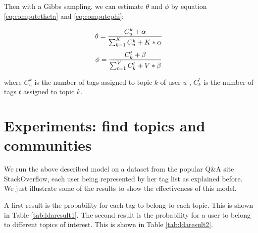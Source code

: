 Then with a Gibbs sampling, we can estimate $\theta$ and $\phi$ by equation \ref{eq:computetheta} and \ref{eq:computephi}:

\begin{equation}\scriptsize
\theta=\frac{ C_u^k + \alpha}{ \sum_{k=1}^K C_u^k+ K* \alpha}
\label{eq:computetheta} 
\end{equation}
\begin{equation}\scriptsize
\phi =\frac{ C_k^t + \beta}{ \sum_{t=1}^V C_k^t+ V* \beta}
\label{eq:computephi} 
\end{equation}

\noindent
where $C_u^k$ is the number of tags assigned to topic $k$ of user $u$ , $C_k^t$ is the number of tags $t$ assigned to topic $k$.


\section{Experiments: find topics and communities}
We run the above described model on a dataset from the popular Q\&A site StackOverflow, each user being represented by her tag list as explained before. We just illustrate some of the results to show the effectiveness of this model.

A first result is the probability for each tag to belong to each topic. This is  shown in Table \ref{tab:ldaresult1}. 
The second result is the probability for a user to belong to different topics of interest. This is shown in Table \ref{tab:ldaresult2}. 

